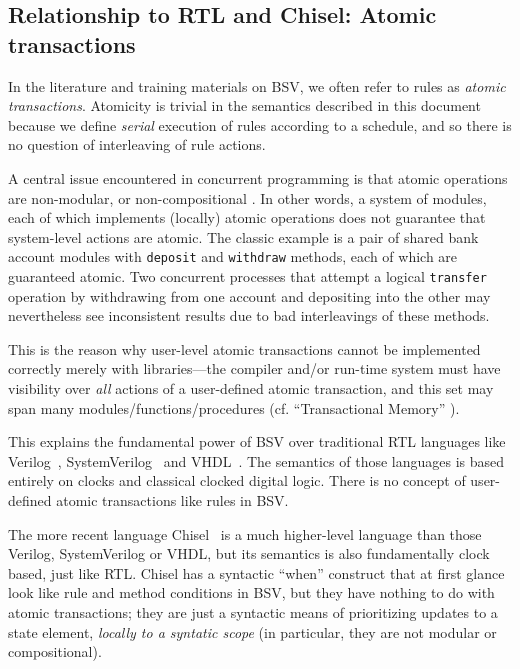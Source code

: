 \documentclass[11pt]{article}
\newcommand{\term}[1]{\texttt{#1}}
\begin{document}

\subsection{Relationship to RTL and Chisel: Atomic transactions}

In the literature and training materials on BSV, we often refer to
rules as \emph{atomic transactions}.  Atomicity is trivial in the
semantics described in this document because we define \emph{serial}
execution of rules according to a schedule, and so there is no
question of interleaving of rule actions.

A central issue encountered in concurrent programming is that atomic
operations are non-modular, or non-compositional \cite{Harris2005}.
In other words, a system of modules, each of which implements
(locally) atomic operations does not guarantee that system-level
actions are atomic.  The classic example is a pair of shared bank
account modules with \term{deposit} and \term{withdraw} methods, each
of which are guaranteed atomic.  Two concurrent processes that attempt
a logical \term{transfer} operation by withdrawing from one account
and depositing into the other may nevertheless see inconsistent
results due to bad interleavings of these methods.

This is the reason why user-level atomic transactions cannot be
implemented correctly merely with libraries---the compiler and/or
run-time system must have visibility over \emph{all} actions of a
user-defined atomic transaction, and this set may span many
modules/functions/procedures (cf. ``Transactional Memory''
\cite{Larus2008a}).

This explains the fundamental power of BSV over traditional RTL
languages like Verilog~\cite{IEEEVerilog2001a},
SystemVerilog~\cite{IEEESystemVerilog2012a} and
VHDL~\cite{IEEEVHDL2002}.  The semantics of those languages is based
entirely on clocks and classical clocked digital logic.  There is no
concept of user-defined atomic transactions like rules in BSV.

The more recent language Chisel~\cite{BachRach2012} is a much
higher-level language than those Verilog, SystemVerilog or VHDL, but
its semantics is also fundamentally clock based, just like RTL.
Chisel has a syntactic ``when'' construct that at first glance look
like rule and method conditions in BSV, but they have nothing to do
with atomic transactions; they are just a syntactic means of
prioritizing updates to a state element, \emph{locally to a syntatic
scope} (in particular, they are not modular or compositional).
\end{document}
